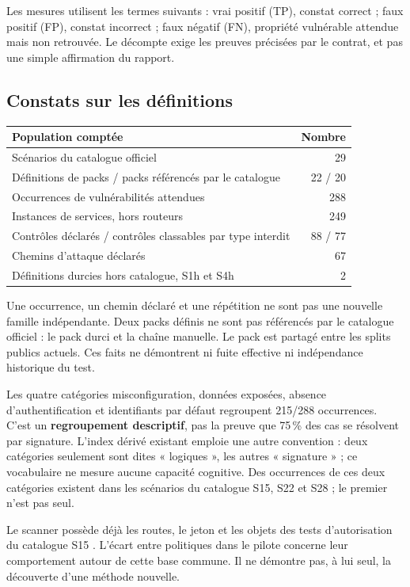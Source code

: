 \documentclass[11pt,a4paper]{article}
\newcommand{\code}[1]{{\small\ttfamily\path{#1}}}
\begin{document}
Les mesures utilisent les termes suivants : vrai positif (TP), constat correct ; faux positif (FP), constat incorrect ; faux négatif (FN), propriété vulnérable attendue mais non retrouvée. Le décompte exige les preuves précisées par le contrat, et pas une simple affirmation du rapport.

\subsection{Constats sur les définitions}

\begin{tabularx}{\textwidth}{@{}Y r@{}}\toprule
Population comptée & Nombre\\\midrule
Scénarios du catalogue officiel & 29\\
Définitions de packs / packs référencés par le catalogue & 22 / 20\\
Occurrences de vulnérabilités attendues & 288\\
Instances de services, hors routeurs & 249\\
Contrôles déclarés / contrôles classables par type interdit & 88 / 77\\
Chemins d'attaque déclarés & 67\\
Définitions durcies hors catalogue, S1h et S4h & 2\\\bottomrule
\end{tabularx}

Une occurrence, un chemin déclaré et une répétition ne sont pas une nouvelle famille indépendante. Deux packs définis ne sont pas référencés par le catalogue officiel : le pack durci \code{f0} et la chaîne manuelle. Le pack \code{f10_sparse_precision} est partagé entre les splits publics actuels. Ces faits ne démontrent ni fuite effective ni indépendance historique du test.

Les quatre catégories misconfiguration, données exposées, absence d'authentification et identifiants par défaut regroupent 215/288 occurrences. C'est un \textbf{regroupement descriptif}, pas la preuve que 75\,\% des cas se résolvent par signature. L'index dérivé existant emploie une autre convention : deux catégories seulement sont dites « logiques », les autres « signature » ; ce vocabulaire ne mesure aucune capacité cognitive. Des occurrences de ces deux catégories existent dans les scénarios du catalogue S15, S22 et S28 ; le premier n’est pas seul.

Le scanner possède déjà les routes, le jeton et les objets des tests d'autorisation du catalogue S15 \cite{scanner}. L'écart entre politiques dans le pilote concerne leur comportement autour de cette base commune. Il ne démontre pas, à lui seul, la découverte d'une méthode nouvelle.
\end{document}
